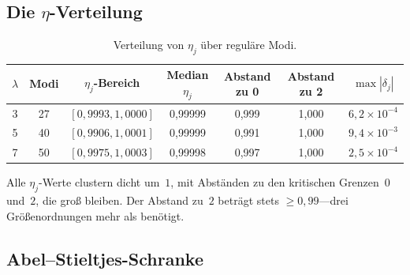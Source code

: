 \documentclass[12pt,a4paper]{article}
\theoremstyle{definition}
\theoremstyle{remark}
\begin{document}
\subsection{Die \texorpdfstring{$\eta$}{eta}-Verteilung}

\begin{table}[h]
\centering
\caption{Verteilung von $\eta_j$ über reguläre Modi.}
\label{tab:eta}
\begin{tabular}{ccccccc}
\toprule
$\lambda$ & Modi & $\eta_j$-Bereich & Median $\eta_j$ &
  Abstand zu 0 & Abstand zu 2 & $\max|\delta_j|$ \\
\midrule
3 & 27 & $[0{,}9993, 1{,}0000]$ & 0,99999 & 0,999 & 1,000 &
  $6{,}2 \times 10^{-4}$ \\
5 & 40 & $[0{,}9906, 1{,}0001]$ & 0,99999 & 0,991 & 1,000 &
  $9{,}4 \times 10^{-3}$ \\
7 & 50 & $[0{,}9975, 1{,}0003]$ & 0,99998 & 0,997 & 1,000 &
  $2{,}5 \times 10^{-4}$ \\
\bottomrule
\end{tabular}
\end{table}

Alle $\eta_j$-Werte clustern dicht um~$1$, mit Abständen zu den kritischen
Grenzen~$0$ und~$2$, die groß bleiben.
Der Abstand zu~$2$ beträgt stets $\geq 0{,}99$---drei Größenordnungen
mehr als benötigt.

\subsection{Abel--Stieltjes-Schranke}

\begin{table}[h]
\centering
\caption{Abel--Stieltjes-Schranke und Tail-vs-Gap-Ungleichung über alle
Konfigurationen.}
\label{tab:abel}
\small
{}
\end{table}
\end{document}
